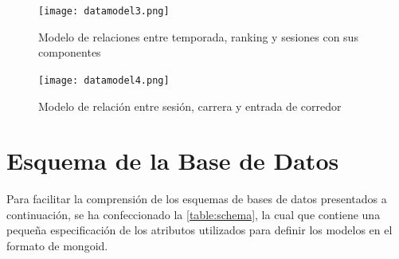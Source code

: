 \begin{figure}[H]
  \begin{center}
    \texttt{[image: datamodel3.png]}
  \end{center}
  \caption[Modelo de relaciones entre temporada, ranking y sesiones con sus componentes]{Modelo de relaciones entre temporada, ranking y sesiones con sus componentes}
  \label{fig:datamodels3}
\end{figure}

\begin{figure}[H]
  \begin{center}
    \texttt{[image: datamodel4.png]}
  \end{center}
  \caption[Modelo de relación entre sesión, carrera y entrada de corredor]{Modelo de relación entre sesión, carrera y entrada de corredor}
  \label{fig:datamodels4}
\end{figure}

\newpage

\section{Esquema de la Base de Datos}
Para facilitar la comprensión de los esquemas de bases de datos presentados a continuación, se ha confeccionado la \autoref{table:schema}, la cual que contiene una pequeña especificación de los atributos utilizados para definir los modelos en el formato de mongoid.

